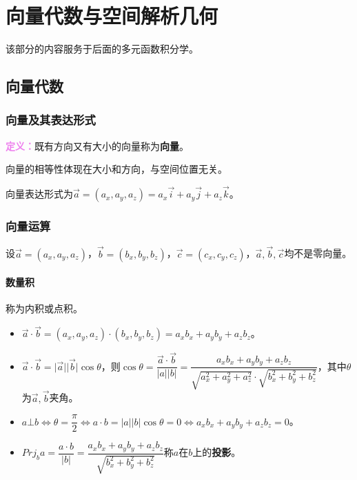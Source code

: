 \setcounter{tocdepth}{4}
\setcounter{secnumdepth}{4}
\renewcommand{\baselinestretch}{1.5}
\chapter{向量代数与空间解析几何}

该部分的内容服务于后面的多元函数积分学。

\section{向量代数}

\subsection{向量及其表达形式}

\textcolor{violet}{\textbf{定义：}}既有方向又有大小的向量称为\textbf{向量}。

向量的相等性体现在大小和方向，与空间位置无关。

向量表达形式为$\vec{a}=(a_x,a_y,a_z)=a_x\vec{i}+a_y\vec{j}+a_z\vec{k}$。

\subsection{向量运算}

设$\vec{a}=(a_x,a_y,a_z)$，$\vec{b}=(b_x,b_y,b_z)$，$\vec{c}=(c_x,c_y,c_z)$，$\vec{a},\vec{b},\vec{c}$均不是零向量。

\subsubsection{数量积}

称为内积或点积。

\begin{itemize}
    \item $\vec{a}\cdot\vec{b}=(a_x,a_y,a_z)\cdot(b_x,b_y,b_z)=a_xb_x+a_yb_y+a_zb_z$。
    \item $\vec{a}\cdot\vec{b}=\vert\vec{a}\vert\vert\vec{b}\vert\cos\theta$，则$\cos\theta=\dfrac{\vec{a}\cdot\vec{b}}{\vert a\vert\vert b\vert}=\dfrac{a_xb_x+a_yb_y+a_zb_z}{\sqrt{a_x^2+a_y^2+a_z^2}\cdot\sqrt{b_x^2+b_y^2+b_z^2}}$，其中$\theta$为$\vec{a},\vec{b}$夹角。
    \item $a\bot b\Leftrightarrow\theta=\dfrac{\pi}{2}\Leftrightarrow a\cdot b=\vert a\vert\vert b\vert\cos\theta=0\Leftrightarrow a_xb_x+a_yb_y+a_zb_z=0$。
    \item $Prj_ba=\dfrac{a\cdot b}{\vert b\vert}=\dfrac{a_xb_x+a_yb_y+a_zb_z}{\sqrt{b_x^2+b_y^2+b_z^2}}$称$a$在$b$上的\textbf{投影}。
\end{itemize}

